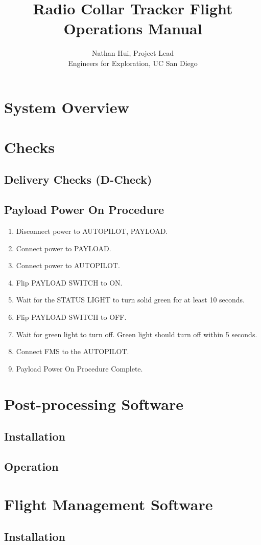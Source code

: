 \documentclass{report}
\title{Radio Collar Tracker Flight Operations Manual}
\author{Nathan Hui, Project Lead\\Engineers for Exploration, UC San Diego}
\begin{document}
\maketitle
\tableofcontents
\chapter{System Overview}
\chapter{Checks}
\section{Delivery Checks (D-Check)}
\section{Payload Power On Procedure}
\begin{enumerate}
	\item Disconnect power to AUTOPILOT, PAYLOAD.
	\item Connect power to PAYLOAD.
	\item Connect power to AUTOPILOT.
	\item Flip PAYLOAD SWITCH to ON.
	\item Wait for the STATUS LIGHT to turn solid green for at least 10 seconds.
	\item Flip PAYLOAD SWITCH to OFF.
	\item Wait for green light to turn off.  Green light should turn off within 5 seconds.
	\item Connect FMS to the AUTOPILOT.
	\item Payload Power On Procedure Complete.
\end{enumerate}
\chapter{Post-processing Software}
\section{Installation}
\section{Operation}
\chapter{Flight Management Software}
\section{Installation}
\end{document}
